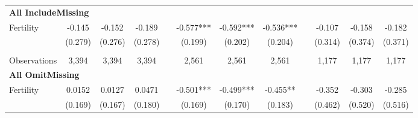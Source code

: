 \begin{landscape}
\begin{table}[htpb!]
\begin{center}
\begin{tabular}{lcccp{2mm}cccp{2mm}ccc}
\multicolumn{12}{l}{\textbf{All IncludeMissing}}\\ 
Fertility&-0.145&-0.152&-0.189&&-0.577***&-0.592***&-0.536***&&-0.107&-0.158&-0.182\\
&(0.279)&(0.276)&(0.278)&&(0.199)&(0.202)&(0.204)&&(0.314)&(0.374)&(0.371)\\
\begin{footnotesize}\end{footnotesize}&\begin{footnotesize}\end{footnotesize}&\begin{footnotesize}\end{footnotesize}&\begin{footnotesize}\end{footnotesize}&\begin{footnotesize}\end{footnotesize}&\begin{footnotesize}\end{footnotesize}&\begin{footnotesize}\end{footnotesize}&\begin{footnotesize}\end{footnotesize}&\begin{footnotesize}\end{footnotesize}&\begin{footnotesize}\end{footnotesize}&\begin{footnotesize}\end{footnotesize}&\begin{footnotesize}\end{footnotesize}\\Observations&3,394&3,394&3,394&&2,561&2,561&2,561&&1,177&1,177&1,177\\
\multicolumn{12}{l}{\textbf{All OmitMissing}}\\ 
Fertility&0.0152&0.0127&0.0471&&-0.501***&-0.499***&-0.455**&&-0.352&-0.303&-0.285\\
&(0.169)&(0.167)&(0.180)&&(0.169)&(0.170)&(0.183)&&(0.462)&(0.520)&(0.516)\\

\end{tabular}
\end{center}
\end{table}
\end{landscape}
